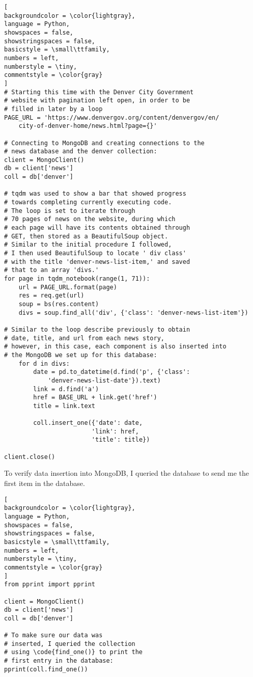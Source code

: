 \documentclass[]{article}
\newcommand{\code}[1]{\colorbox{light-gray}{\texttt{#1}}}
\begin{document}
\begin{lstlisting}[
backgroundcolor = \color{lightgray},
language = Python,
showspaces = false,
showstringspaces = false,
basicstyle = \small\ttfamily,
numbers = left,
numberstyle = \tiny,
commentstyle = \color{gray}
]
# Starting this time with the Denver City Government
# website with pagination left open, in order to be
# filled in later by a loop
PAGE_URL = 'https://www.denvergov.org/content/denvergov/en/
	city-of-denver-home/news.html?page={}'

# Connecting to MongoDB and creating connections to the
# news database and the denver collection:
client = MongoClient()
db = client['news']
coll = db['denver']

# tqdm was used to show a bar that showed progress
# towards completing currently executing code.
# The loop is set to iterate through
# 70 pages of news on the website, during which
# each page will have its contents obtained through
# GET, then stored as a BeautifulSoup object.
# Similar to the initial procedure I followed,
# I then used BeautifulSoup to locate ' div class'
# with the title 'denver-news-list-item,' and saved
# that to an array 'divs.'
for page in tqdm_notebook(range(1, 71)):        
	url = PAGE_URL.format(page)
	res = req.get(url)
	soup = bs(res.content)
	divs = soup.find_all('div', {'class': 'denver-news-list-item'})

# Similar to the loop describe previously to obtain
# date, title, and url from each news story,
# however, in this case, each component is also inserted into
# the MongoDB we set up for this database:
	for d in divs:
		date = pd.to_datetime(d.find('p', {'class': 
			'denver-news-list-date'}).text)
		link = d.find('a')
		href = BASE_URL + link.get('href')
		title = link.text

		coll.insert_one({'date': date,
						'link': href,
						'title': title})

client.close()
\end{lstlisting}
To verify data insertion into MongoDB, I queried the database to send me the first item in the database.
\begin{lstlisting}[
backgroundcolor = \color{lightgray},
language = Python,
showspaces = false,
showstringspaces = false,
basicstyle = \small\ttfamily,
numbers = left,
numberstyle = \tiny,
commentstyle = \color{gray}
]
from pprint import pprint

client = MongoClient()
db = client['news']
coll = db['denver']

# To make sure our data was
# inserted, I queried the collection
# using \code{find_one()} to print the
# first entry in the database:
pprint(coll.find_one())
\end{lstlisting}
\end{document}
